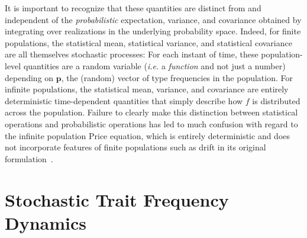 It is important to recognize that these quantities are distinct from and independent of the \emph{probabilistic} expectation, variance, and covariance obtained by integrating over realizations in the underlying probability space. Indeed, for finite populations, the statistical mean, statistical variance, and statistical covariance are all themselves stochastic processes: For each instant of time, these population-level quantities are a random variable (\emph{i.e.} a \emph{function} and not just a number) depending on $\mathbf{p}$, the (random) vector of type frequencies in the population. For infinite populations, the statistical mean, variance, and covariance are entirely deterministic time-dependent quantities that simply describe how $f$ is distributed across the population. Failure to clearly make this distinction between statistical operations and probabilistic operations has led to much confusion with regard to the infinite population Price equation, which is entirely deterministic and does not incorporate features of finite populations such as drift in its original formulation~\citep{frank_price_1997,van_veelen_use_2005,frank_natural_2012}.

\section{Stochastic Trait Frequency Dynamics}\label{sec_nD_freq_eqns}

